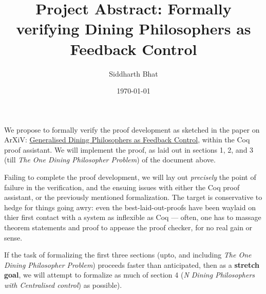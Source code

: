 \documentclass{article}
\begin{document}
\author{Siddharth Bhat}
\title{Project Abstract: Formally verifying Dining Philosophers as Feedback Control}
\date{\today}
\maketitle

We propose to formally verify the proof development as sketched in the
paper on ArXiV: \href{https://arxiv.org/pdf/1805.02010.pdf}{Generalised Dining Philosophers as Feedback Control},
within the Coq proof assistant.
We will implement the proof, as laid out in sections
1, 2, and 3 (till \emph{The One Dining Philosopher Problem}) of the document
above.

Failing to complete the proof development,
we will lay out \emph{precisely} the point of failure in the verification, and
the ensuing issues with either the Coq proof assistant, or the previously
mentioned formalization. The target is conservative to hedge for things going
awry: even the best-laid-out-proofs have been waylaid on thier first contact
with a system as inflexible as Coq --- often, one has to massage theorem
statements and proof to appease the proof checker, for no
real gain or sense.

If the task of formalizing the first three sections (upto, and including
\emph{The One Dining Philosopher Problem}) proceeds faster than anticipated,
then as a \textbf{stretch goal}, we will attempt to formalize as much
of section 4 (\emph{N Dining Philosophers with Centralised control}) as possible).
\end{document}
